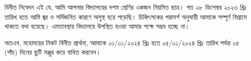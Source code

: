 \documentclass{bdletter}
\begin{document}
\PrintLetterHeader

বিনীত নিবেদন এই যে, আমি আপনার বিদ্যালয়ের দশম শ্রেণির একজন নিয়মিত ছাত্র।
গত ২৮ ডিসেম্বর ২০২৩ খ্রিঃ তারিখ হতে আমি জ্বর ও সর্দিজনিত কারণে অসুস্থ হয়ে পড়েছি।
চিকিৎসকের পরামর্শ অনুযায়ী আমাকে সম্পূর্ণ বিশ্রামে থাকতে বলা হয়েছে।
এমতাবস্থায় বিদ্যালয়ে উপস্থিত হওয়া আমার পক্ষে সম্ভব হচ্ছে না।

অতএব, মহোদয়ের নিকট বিনীত প্রার্থনা, আমাকে ০১/০১/২০২৪ খ্রিঃ হতে ০৫/০১/২০২৪ খ্রিঃ
তারিখ পর্যন্ত ০৫ (পাঁচ) দিনের ছুটি মঞ্জুর করে বাধিত করবেন।

\PrintLetterFooter
\end{document}
